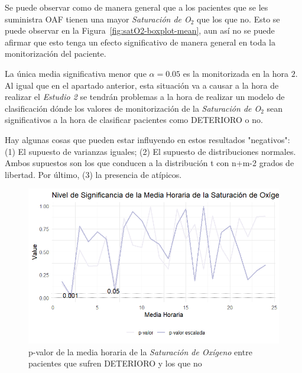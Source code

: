 Se puede observar como de manera general que a los pacientes que se les suministra OAF tienen una mayor \textit{Saturación de O$_2$} que los que no. Esto se puede observar en la Figura~\ref{fig:satO2-boxplot-mean}, aun así no se puede afirmar que esto tenga un efecto significativo de manera general en toda la monitorización del paciente.

La única media significativa menor que $\alpha = 0.05$ es la monitorizada en la hora $2$. Al igual que en el apartado anterior, esta situación va a causar a la hora de realizar el \textit{Estudio 2} se tendrán problemas a la hora de realizar un modelo de clasificación dónde los valores de monitorización de la \textit{Saturación de O$_2$} sean significativos a la hora de clasificar pacientes como DETERIORO o no.

{\color{blue} Hay algunas cosas que pueden estar influyendo en estos resultados "negativos": (1) El supuesto de varianzas iguales; (2) El supuesto de distribuciones normales. Ambos supuestos son los que conducen a la distribución t con n+m-2 grados de libertad. Por último, (3) la presencia de atípicos.}

\begin{figure}[H]
    \centering
    \includegraphics[scale = 1]{./img/mean-SatO2.png}
    \caption{p-valor de la media horaria de la \textit{Saturación de Oxígeno} entre pacientes que sufren DETERIORO y los que no}
    \label{fig:mean-SatO2}
\end{figure}

